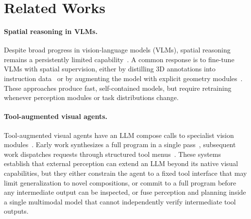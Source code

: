 \section{Related Works}
\label{app:related}

\paragraph{Spatial reasoning in VLMs.}
Despite broad progress in vision-language models (VLMs), spatial reasoning remains a persistently limited capability~\citep{chen2024spatialvlm,cheng2024spatialrgpt,song2025robospatial}.
A common response is to fine-tune VLMs with spatial supervision, either by distilling 3D annotations into instruction data~\citep{chen2024spatialvlm,cheng2024spatialrgpt} or by augmenting the model with explicit geometry modules~\citep{hu2025g,fan2025vlm,zhang2026make}.
These approaches produce fast, self-contained models, but require retraining whenever perception modules or task distributions change.

\paragraph{Tool-augmented visual agents.}
Tool-augmented visual agents have an LLM compose calls to specialist vision modules~\citep{Gupta2022VisProg,surismenon2023vipergpt,shen2023hugginggpt,zhao2025pyvision,lu2026octotools}.
Early work synthesizes a full program in a single pass~\citep{Gupta2022VisProg,surismenon2023vipergpt}, subsequent work dispatches requests through structured tool menus~\citep{shen2023hugginggpt,lu2026octotools}.
These systems establish that external perception can extend an LLM beyond its native visual capabilities, but they either constrain the agent to a fixed tool interface that may limit generalization to novel compositions, or commit to a full program before any intermediate output can be inspected, or fuse perception and planning inside a single multimodal model that cannot independently verify intermediate tool outputs.

